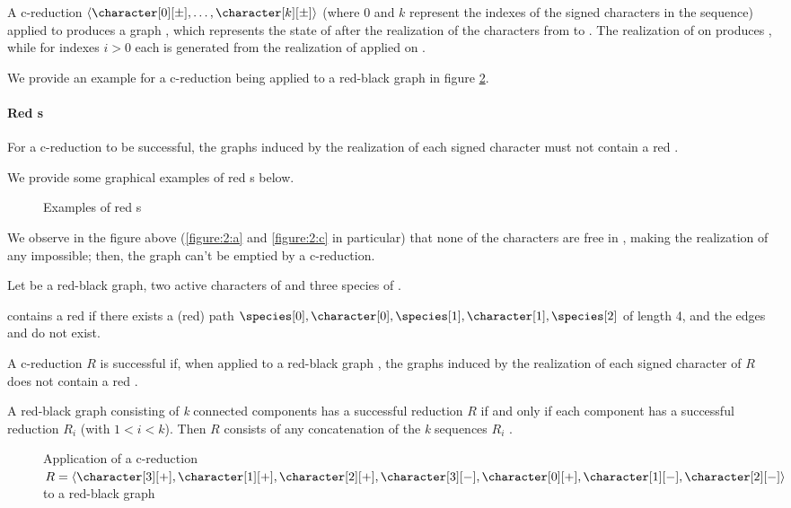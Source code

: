 A c-reduction $\langle \character[0][\pm], \dots, \character[k][\pm] \rangle$ (where $0$ and $k$ represent the indexes of the signed characters in the sequence) applied to \grb{} produces a graph \grb[k], which represents the state of \grb{} after the realization of the characters from \character[0][\pm] to \character[k][\pm].
The realization of \character[0][\pm] on \grb{} produces \grb[0], while for indexes $i > 0$ each \grb[i] is generated from the realization of \character[i][\pm] applied on \grb[i-1].

We provide an example for a c-reduction being applied to a red-black graph in figure \ref{figure:3}.

\paragraph{Red \boldmath{\sg{}}s}

For a c-reduction to be successful, the graphs \grb[i] induced by the realization of each signed character \character[i][\pm] must not contain a red \sg{}.

We provide some graphical examples of red \sg{}s below.

\begin{figure}[h]
  

  \caption{Examples of red \sg{}s}\label{figure:2}
\end{figure}

We observe in the figure above (\ref{figure:2:a} and \ref{figure:2:c} in particular) that none of the characters are free in \grb{}, making the realization of any \character[i][-] impossible; then, the graph can't be emptied by a c-reduction.

\begin{definition}[Red \sg{}]\label{definition:sigma-graph}
  Let \grb{} be a red-black graph, \character[0] \character[1] two active characters of \grb{} and \species[0] \species[1] \species[2] three species of \grb{}.

  \grb{} contains a red \sg{} if there exists a (red) path $\species[0], \character[0], \species[1], \character[1], \species[2]$ of length 4, and the edges \edge{\character[0]}{\species[2]} and \edge{\character[1]}{\species[0]} do not exist.
\end{definition}

A c-reduction $R$ is successful if, when applied to a red-black graph \grb{}, the graphs \grb[i] induced by the realization of each signed character \character[i][\pm] of $R$ does not contain a red \sg{}.

A red-black graph consisting of \textit{k} connected components has a successful reduction $R$ if and only if each component has a successful reduction $R_{i}$ (with $1 < i < k$). Then $R$ consists of any concatenation of the \textit{k} sequences $R_{i}$ \cite{PPPptime2016}.

\begin{figure}[H]
  

  \caption{Application of a c-reduction $R = \langle \character[3][+], \character[1][+], \character[2][+], \character[3][-], \character[0][+], \character[1][-], \character[2][-] \rangle$ to a red-black graph \grb{}}\label{figure:3}
\end{figure}
